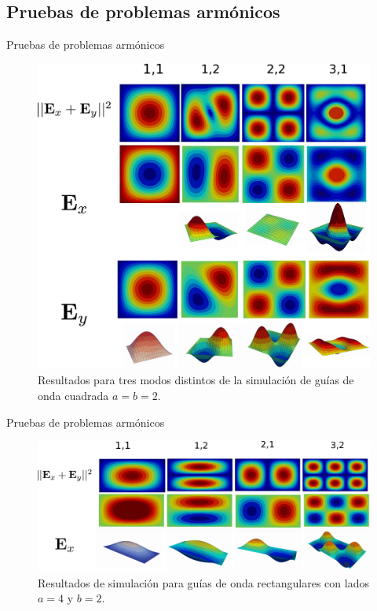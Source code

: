 \documentclass[xcolor=table,serif,handout]{beamer}
\begin{document}
	\subsection{Pruebas de problemas armónicos}
	\begin{frame}{Pruebas de problemas armónicos}
		\begin{figure}
		\centering
		\includegraphics[scale=0.07]{square_waveguide.eps}
		\caption{Resultados para tres modos distintos de la simulación de guías de onda cuadrada $a=b=2$.}
		\end{figure}
	\end{frame}
	\begin{frame}{Pruebas de problemas armónicos}
		\begin{figure}
		\centering
		\includegraphics[scale=0.06]{rectangular_waveguide.pdf}
		\caption{Resultados de simulación para guías de onda rectangulares con lados $a=4$ y $b=2$.}
		\label{fig:rectangular_waveguide}
		\end{figure}
	\end{frame}
\end{document}
